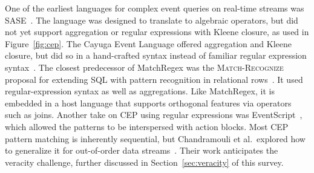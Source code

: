 One of the earliest languages for complex event queries on real-time
streams was SASE~\cite{WuDR06}. The language was designed to translate
to algebraic operators, but did not yet support aggregation or regular
expressions with Kleene closure, as used in Figure~\ref{fig:cep}.
The Cayuga Event Language offered aggregation and Kleene closure, but
did so in a hand-crafted syntax instead of familiar regular expression
syntax~\cite{demers_et_al_2007}.
The closest predecessor of MatchRegex was the \textsc{Match-Recognize}
proposal for extending SQL with pattern recognition in relational
rows~\cite{zemke_et_al_2007}. It used regular-expression syntax as
well as aggregations. Like MatchRegex, it is embedded in a host
language that supports orthogonal features via operators such as
joins.
Another take on CEP using regular expressions was
EventScript~\cite{cohen_kalleberg_2008}, which allowed the patterns to
be interspersed with action blocks.
Most CEP pattern matching is inherently sequential, but Chandramouli et
al.\ explored how to generalize it for out-of-order data
streams~\cite{chandramouli_goldstein_maier_2010}. Their work
anticipates the veracity challenge, further discussed in
Section~\ref{sec:veracity} of this survey.
